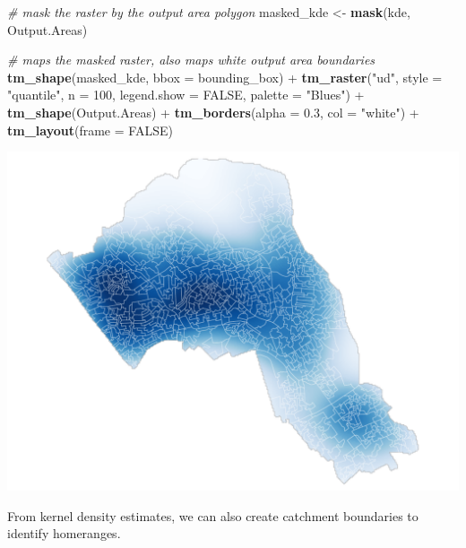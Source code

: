 \documentclass[]{article}
\newenvironment{Shaded}{}{}
\newcommand{\CommentTok}[1]{\textcolor[rgb]{0.38,0.63,0.69}{\textit{#1}}}
\newcommand{\DataTypeTok}[1]{\textcolor[rgb]{0.56,0.13,0.00}{#1}}
\newcommand{\DecValTok}[1]{\textcolor[rgb]{0.25,0.63,0.44}{#1}}
\newcommand{\FloatTok}[1]{\textcolor[rgb]{0.25,0.63,0.44}{#1}}
\newcommand{\KeywordTok}[1]{\textcolor[rgb]{0.00,0.44,0.13}{\textbf{#1}}}
\newcommand{\NormalTok}[1]{#1}
\newcommand{\OperatorTok}[1]{\textcolor[rgb]{0.40,0.40,0.40}{#1}}
\newcommand{\OtherTok}[1]{\textcolor[rgb]{0.00,0.44,0.13}{#1}}
\newcommand{\StringTok}[1]{\textcolor[rgb]{0.25,0.44,0.63}{#1}}
\begin{document}
\begin{Shaded}
\begin{Highlighting}[]
\CommentTok{# mask the raster by the output area polygon}
\NormalTok{masked_kde <-}\StringTok{ }\KeywordTok{mask}\NormalTok{(kde, Output.Areas)}

\CommentTok{# maps the masked raster, also maps white output area boundaries}
\KeywordTok{tm_shape}\NormalTok{(masked_kde, }\DataTypeTok{bbox =}\NormalTok{ bounding_box) }\OperatorTok{+}\StringTok{ }\KeywordTok{tm_raster}\NormalTok{(}\StringTok{"ud"}\NormalTok{, }\DataTypeTok{style =} \StringTok{"quantile"}\NormalTok{,}
                                                      \DataTypeTok{n =} \DecValTok{100}\NormalTok{,}
                                                      \DataTypeTok{legend.show =} \OtherTok{FALSE}\NormalTok{,}
                                                      \DataTypeTok{palette =} \StringTok{"Blues"}\NormalTok{) }\OperatorTok{+}\StringTok{ }
\StringTok{  }\KeywordTok{tm_shape}\NormalTok{(Output.Areas) }\OperatorTok{+}\StringTok{ }\KeywordTok{tm_borders}\NormalTok{(}\DataTypeTok{alpha =} \FloatTok{0.3}\NormalTok{, }\DataTypeTok{col =} \StringTok{"white"}\NormalTok{) }\OperatorTok{+}\StringTok{ }
\StringTok{  }\KeywordTok{tm_layout}\NormalTok{(}\DataTypeTok{frame =} \OtherTok{FALSE}\NormalTok{)}
\end{Highlighting}
\end{Shaded}

\includegraphics{TutorialNotebook_files/figure-latex/unnamed-chunk-33-1.pdf}

From kernel density estimates, we can also create catchment boundaries
to identify homeranges.
\end{document}
